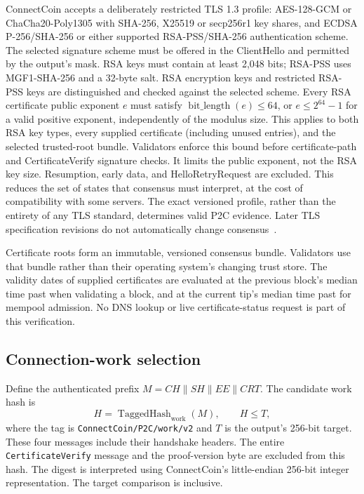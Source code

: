 \documentclass[11pt,a4paper]{article}
\newcommand{\TagHash}{\operatorname{TaggedHash}}
\newcommand{\concat}{\mathbin{\|}}
\begin{document}
ConnectCoin accepts a deliberately restricted TLS 1.3 profile: AES-128-GCM
or ChaCha20-Poly1305 with SHA-256, X25519 or secp256r1 key shares, and
ECDSA P-256/SHA-256 or either supported RSA-PSS/SHA-256 authentication scheme.
The selected signature scheme must be offered in the ClientHello and permitted
by the output's mask. RSA keys must contain at least 2,048 bits; RSA-PSS uses
MGF1-SHA-256 and a 32-byte salt. RSA encryption keys and restricted RSA-PSS
keys are distinguished and checked against the selected scheme.
Every RSA certificate public exponent $e$ must satisfy
$\operatorname{bit\_length}(e)\leq 64$, or $e\leq 2^{64}-1$ for a valid
positive exponent, independently of the modulus size. This applies to both
RSA key types, every supplied certificate (including unused entries), and
the selected trusted-root bundle. Validators enforce this bound before
certificate-path and CertificateVerify signature checks. It limits the
public exponent, not the RSA key size.
Resumption, early data, and HelloRetryRequest are excluded. This
reduces the set of states that consensus must interpret, at the cost of
compatibility with some servers. The exact versioned profile, rather than
the entirety of any TLS standard, determines valid P2C evidence. Later TLS
specification revisions do not automatically change consensus~\cite{tlsupdate}.

Certificate roots form an immutable, versioned consensus bundle. Validators
use that bundle rather than their operating system's changing trust store.
The validity dates of supplied certificates are evaluated at the previous block's median time past
when validating a block, and at the current tip's median time past for mempool
admission. No DNS lookup or live certificate-status request is part of this
verification.

\subsection*{Connection-work selection}

Define the authenticated prefix $M=CH\concat SH\concat EE\concat CRT$.
The candidate work hash is
\begin{equation}
  H=\TagHash_{\mathrm{work}}(M), \qquad H\leq T,
  \label{eq:work}
\end{equation}
where the tag is \texttt{ConnectCoin/P2C/work/v2} and $T$ is the output's
256-bit target. These four messages include their handshake headers.
The entire \texttt{CertificateVerify} message and the proof-version byte are
excluded from this hash. The digest is interpreted using ConnectCoin's little-endian
256-bit integer representation. The target comparison is inclusive.
\end{document}
